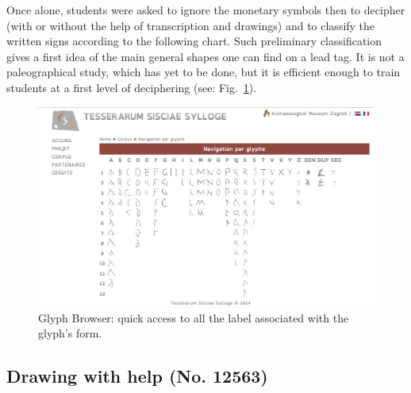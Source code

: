 \documentclass[amsthm,ebook]{saparticle}
\begin{document}
\noindent Once alone, students were asked to ignore the monetary symbols then to decipher (with or without the help of
transcription and drawings) and to classify the written signs according to the following chart. Such preliminary
classification gives a first idea of the main general shapes one can find on a lead tag. It is not a paleographical
study, which has yet to be done, but it is efficient enough to train students at a first level of deciphering (see: Fig.~\ref{fig:table1}).


\begin{figure}[!hbp]
\centering
\includegraphics[width=\columnwidth]{4_glyphs.png}
\caption{Glyph Browser: quick access to all the label associated with the glyph's form.}
\label{fig:table1}
\end{figure}


\subsection{Drawing with help (No. 12563)}
\end{document}
